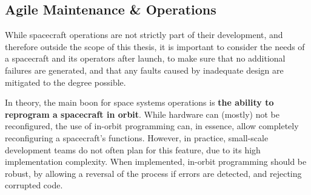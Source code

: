 \documentclass[a4paper,nobib,justified,final]{tufte-book}
\begin{document}
\subsection{Agile Maintenance \& Operations}
\label{sec:METHODOLOGY_operations}

While spacecraft operations are not strictly part of their development, and therefore outside the scope of this thesis, it is important to consider the needs of a spacecraft and its operators after launch, to make sure that no additional failures are generated, and that any faults caused by inadequate design are mitigated to the degree possible.

In theory, the main boon for space systems operations is \textbf{the ability to reprogram a spacecraft in orbit}. While hardware can (mostly) not be reconfigured, the use of in-orbit programming can, in essence, allow completely reconfiguring a spacecraft's functions. However, in practice, small-scale development teams do not often plan for this feature, due to its high implementation complexity. When implemented, in-orbit programming should be robust, by allowing a reversal of the process if errors are detected, and rejecting corrupted code.
\end{document}
